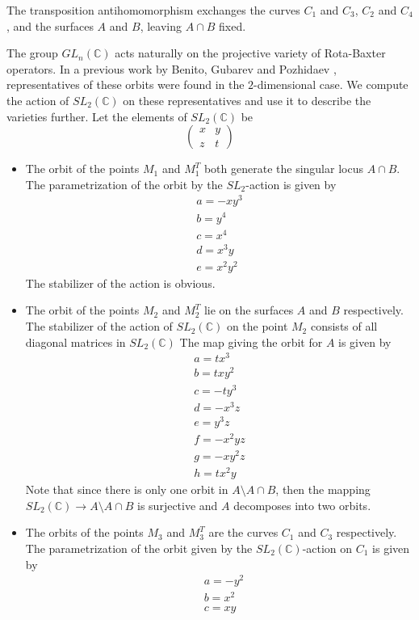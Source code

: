 \documentclass{amsart}
\begin{document}
The transposition antihomomorphism exchanges the curves $C_1$ and $C_3$, $C_2$ and $C_4$, and the surfaces $A$ and $B$, leaving $A \cap B$ fixed.

The group $GL_n(\mathbb{C})$ acts naturally on the projective variety of Rota-Baxter operators. In a previous work by Benito, Gubarev and Pozhidaev \cite{Benito2018}, representatives of these orbits were found in the $2$-dimensional case. We compute the action of $SL_2(\mathbb{C})$ on these representatives and use it to describe the varieties further. Let the elements of $SL_2(\mathbb{C})$ be 
\[\begin{pmatrix}
  x & y\\
  z & t
\end{pmatrix}\]

\begin{itemize}
  \item The orbit of the points $M_1$ and $M_1^T$ both generate the singular locus $A \cap B$. The parametrization of the orbit by the $SL_2$-action is given by
  \begin{align*}
&  a = -x y^{3}\\
  &b = y^{4}\\
  &c = x^{4}\\
  &d = x^{3} y\\
  &e = x^{2} y^{2}
  &\end{align*}
  The stabilizer of the action is obvious.

  \item The orbit of the points $M_2$ and $M_2^T$ lie on the surfaces $A$ and $B$ respectively.
  The stabilizer of the action of $SL_2(\mathbb{C})$ on the point $M_2$ consists of all diagonal matrices in $SL_2(\mathbb{C})$
  The map giving the orbit for $A$ is given by 
  \begin{align*}
&  a = t x^{3}\\
  &b = t x y^{2}\\
  &c = -t y^{3}\\
  &d = -x^{3} z\\
  &e = y^{3} z\\
  &f = -x^{2} y z\\
  &g = -x y^{2} z\\
  &h = t x^{2} y
  &\end{align*}
  Note that since there is only one orbit in $A \setminus A\cap B$, then the mapping $SL_2(\mathbb{C}) \to A \setminus A \cap B$ is surjective and $A$ decomposes into two orbits.

 \item  The orbits of the points $M_3$ and $M_3^T$ are the curves $C_1$ and $C_3$ respectively. 
  The parametrization of the orbit given by the $SL_2(\mathbb{C})$-action on $C_1$ is given by
  \begin{align*}
  &a = -y^2\\
  &b = x^2\\
  &c = xy
  \end{align*}


\end{itemize}
\end{document}
